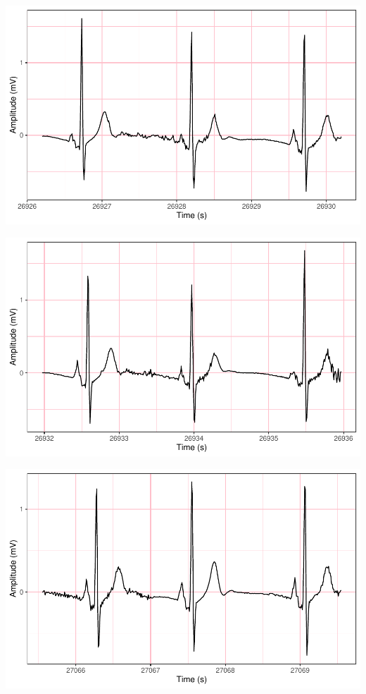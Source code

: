 \documentclass[
]{article}
\begin{document}
\begin{center}\includegraphics{report_files/figure-latex/abnormal-interval-54} \end{center}

\begin{center}\includegraphics{report_files/figure-latex/abnormal-interval-55} \end{center}

\begin{center}\includegraphics{report_files/figure-latex/abnormal-interval-56} \end{center}
\end{document}
